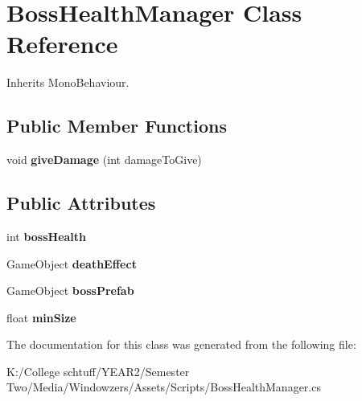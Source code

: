 \hypertarget{class_boss_health_manager}{}\section{Boss\+Health\+Manager Class Reference}
\label{class_boss_health_manager}


Inherits Mono\+Behaviour.

\subsection*{Public Member Functions}
\begin{DoxyCompactItemize}
\item 
\mbox{\label{class_boss_health_manager_af8af28fc2ebb5189c86ff8ef8c0cdabb}} 
void {\bfseries give\+Damage} (int damage\+To\+Give)
\end{DoxyCompactItemize}
\subsection*{Public Attributes}
\begin{DoxyCompactItemize}
\item 
\mbox{\label{class_boss_health_manager_ac6a97fed62ba66541874196f9595bbac}} 
int {\bfseries boss\+Health}
\item 
\mbox{\label{class_boss_health_manager_a59d00d5046b86c285b2059afd30c3140}} 
Game\+Object {\bfseries death\+Effect}
\item 
\mbox{\label{class_boss_health_manager_a3936ad04222ceacb83556e7fb045e867}} 
Game\+Object {\bfseries boss\+Prefab}
\item 
\mbox{\label{class_boss_health_manager_a0282494b318cd0b1f44b1f0ba1707215}} 
float {\bfseries min\+Size}
\end{DoxyCompactItemize}


The documentation for this class was generated from the following file\+:\begin{DoxyCompactItemize}
\item 
K\+:/\+College schtuff/\+Y\+E\+A\+R2/\+Semester Two/\+Media/\+Windowzers/\+Assets/\+Scripts/Boss\+Health\+Manager.\+cs\end{DoxyCompactItemize}
